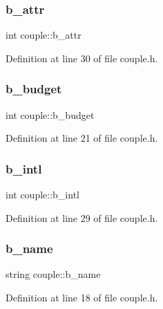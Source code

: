 \subsubsection{\texorpdfstring{b\+\_\+attr}{b\_attr}}
{\footnotesize\ttfamily int couple\+::b\+\_\+attr}



Definition at line 30 of file couple.\+h.

\mbox{\label{classcouple_a2542852754ebeafb8c736b1e27ddda88}} 
\subsubsection{\texorpdfstring{b\+\_\+budget}{b\_budget}}
{\footnotesize\ttfamily int couple\+::b\+\_\+budget}



Definition at line 21 of file couple.\+h.

\mbox{\label{classcouple_ad5b5aadb8e89829fdc5a8e7921f29cba}} 
\subsubsection{\texorpdfstring{b\+\_\+intl}{b\_intl}}
{\footnotesize\ttfamily int couple\+::b\+\_\+intl}



Definition at line 29 of file couple.\+h.

\mbox{\label{classcouple_a6b3c95b7bfa78735cf993324eced3655}} 
\subsubsection{\texorpdfstring{b\+\_\+name}{b\_name}}
{\footnotesize\ttfamily string couple\+::b\+\_\+name}



Definition at line 18 of file couple.\+h.

\mbox{\label{classcouple_a5488ccb8675f26a7130f2cdf63c445de}} 
